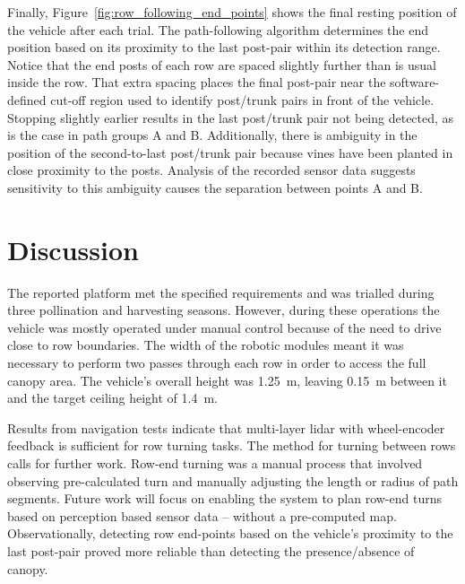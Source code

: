 \documentclass[preprint,authoryear,12pt]{elsarticle}
\begin{document}
    Finally, Figure~\ref{fig:row_following_end_points} shows the final resting position of the vehicle after each trial.
    The path-following algorithm determines the end position based on its proximity to the last post-pair within its detection range.
    Notice that the end posts of each row are spaced slightly further than is usual inside the row.
    That extra spacing places the final post-pair near the software-defined cut-off region used to identify post/trunk pairs in front of the vehicle.
    Stopping slightly earlier results in the last post/trunk pair not being detected, as is the case in path groups A and B.
    Additionally, there is ambiguity in the position of the second-to-last post/trunk pair because vines have been planted in close proximity to the posts.
    Analysis of the recorded sensor data suggests sensitivity to this ambiguity causes the separation between points A and B.

\section{Discussion}
\label{sect:discussion}


    The reported platform met the specified requirements and was trialled during three pollination and harvesting seasons.
    However, during these operations the vehicle was mostly operated under manual control because of the need to drive close to row boundaries.
    The width of the robotic modules meant it was necessary to perform two passes through each row in order to access the full canopy area.
    The vehicle's overall height was \SI{1.25}{\meter}, leaving \SI{0.15}{\meter} between it and the target ceiling height of \SI{1.4}{\meter}.

    Results from navigation tests indicate that multi-layer lidar with wheel-encoder feedback is sufficient for row turning tasks.
    The method for turning between rows calls for further work.
    Row-end turning was a manual process that involved observing pre-calculated turn and manually adjusting the length or radius of path segments.
    Future work will focus on enabling the system to plan row-end turns based on perception based sensor data -- without a pre-computed map.
    Observationally, detecting row end-points based on the vehicle's proximity to the last post-pair proved more reliable than detecting the presence/absence of canopy.
\end{document}
